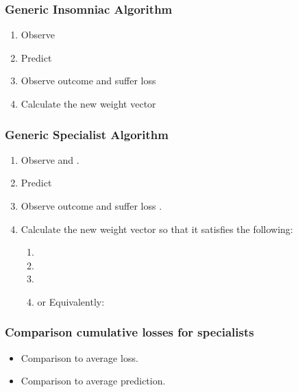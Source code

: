 \documentclass{beamer}
\begin{document}
\begin{frame}
\frametitle{Generic Insomniac Algorithm}
{} 
\begin{enumerate}
 \item Observe 
 \item Predict 
 \item Observe outcome  and 
       suffer loss 
 \item Calculate the new weight vector\\
\end{enumerate}
\end{frame}

\begin{frame}
\frametitle{Generic Specialist Algorithm}
{} 
\begin{enumerate}
 \item Observe  and .
 \item Predict 
 \item Observe outcome  and 
       suffer loss .
 \item Calculate the new weight vector
	  so that it satisfies the following:
   \begin{enumerate}
      \item {}
      \item {}
      \item {}
      \item or Equivalently: 
   \end{enumerate}
\end{enumerate}
\end{frame}

\begin{frame}
\frametitle{Comparison cumulative losses for specialists}
\begin{itemize}
\item Comparison to average loss.
\R{\[
\min_{\vu \in \simplex{N}} \sum_{t=1}^T 
\clossi{\vu}(\advicevec{t},\outcome{t}) 
\;\; \mbox{ where }\;\; 
\clossi{\vu}(\advicevec{t},\outcome{t}) \doteq
\frac{\sum_{i \in \aset{t}} u_i \; \loss(\advice{i}{t},\outcome{t})}{\sum_{i \in \aset{t}} u_i}~.
\]}
\item Comparison to average prediction.
\R{\[
\min_{\vu \in \simplex{N}} \sum_{t=1}^T 
\clossii{\vu}(\advicevec{t},\outcome{t})
\;\; \mbox{ where } \;\; 
\clossii{\vu}(\advicevec{t},\outcome{t}) \doteq
  \loss \left(
   \frac{\sum_{i \in \aset{t}} u_i \advice{i}{t}}
        {\sum_{i \in \aset{t}} u_i}
   ,\outcome{t}
  \right)
\]}

\end{itemize}
\end{frame}
\end{document}
